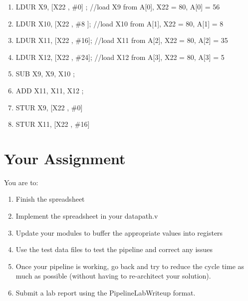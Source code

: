 \begin{enumerate}
\item LDUR X9, [X22 , \#0] ;     //load X9 from A[0], X22 = 80, A[0] = 56
\item LDUR X10, [X22 , \#8 ];    //load X10 from A[1], X22 = 80, A[1] = 8
\item LDUR X11, [X22 , \#16];    //load X11 from A[2], X22 = 80, A[2] = 35 
\item LDUR X12, [X22 , \#24];    //load X12 from A[3], X22 = 80, A[3] = 5
\item SUB X9, X9, X10 ; 
\item ADD X11, X11, X12 ; 
\item STUR X9,  [X22 , \#0]
\item STUR X11, [X22 , \#16]
\end{enumerate}
  


\section{Your Assignment}

You are to:
\begin{enumerate}
\item Finish the spreadsheet
\item Implement the spreadsheet in your datapath.v
\item Update your modules to buffer the appropriate values into registers
\item Use the test data files to test the pipeline and correct any issues
\item Once your pipeline is working, go back and try to reduce the cycle time as much as possible (without having to re-architect your solution).
\item Submit a lab report using the PipelineLabWriteup format.
\end{enumerate} 